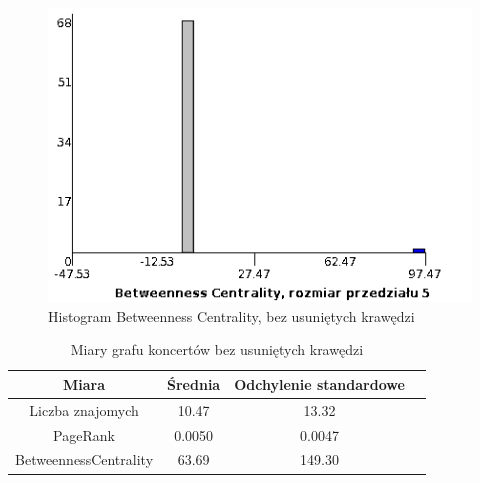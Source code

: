 \documentclass[10pt,a4paper]{article}
\begin{document}
\begin{figure}[H]
\centering
\caption{Histogram Betweenness Centrality, bez usuniętych krawędzi}
\includegraphics[scale=0.6]{wyniki/final200Events/0200eventsBCHist.png}
\end{figure}


\begin{table}[H]
  \caption{Miary grafu koncertów  bez usuniętych krawędzi}
  \centering
    \begin{tabular}{cccc}
    \addlinespace
    \toprule
    Miara & Średnia  & Odchylenie standardowe \\
    \midrule
    Liczba znajomych & 10.47 & 13.32 \\
    PageRank & 0.0050 & 0.0047 \\
    BetweennessCentrality & 63.69 & 149.30\\ 
    \bottomrule
    \end{tabular}
  \label{tab:addlabel}
\end{table}
\end{document}
